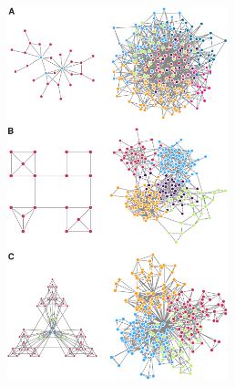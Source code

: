 \begin{figure}[h!]
    \centering
    \includegraphics[width=0.57\textwidth]{img/intro/3_coexpr/intro_3_coexpr_ravasz_hierarchical_clustering.pdf}

\end{figure}
